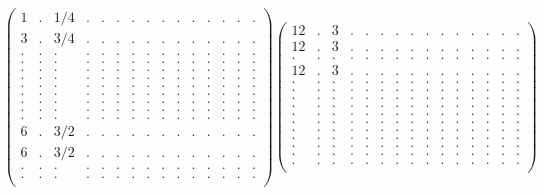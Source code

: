 \documentclass[12pt,a4paper]{amsart}
\begin{document}
\begin{align*}
\left(\begin{array}{rrrrrrrrrrrrrrr}%
1&.&1/4&.&.&.&.&.&.&.&.&.&.&.&.\\%
3&.&3/4&.&.&.&.&.&.&.&.&.&.&.&.\\%
.&.&.&.&.&.&.&.&.&.&.&.&.&.&.\\%
.&.&.&.&.&.&.&.&.&.&.&.&.&.&.\\%
.&.&.&.&.&.&.&.&.&.&.&.&.&.&.\\%
.&.&.&.&.&.&.&.&.&.&.&.&.&.&.\\%
.&.&.&.&.&.&.&.&.&.&.&.&.&.&.\\%
.&.&.&.&.&.&.&.&.&.&.&.&.&.&.\\%
.&.&.&.&.&.&.&.&.&.&.&.&.&.&.\\%
.&.&.&.&.&.&.&.&.&.&.&.&.&.&.\\%
.&.&.&.&.&.&.&.&.&.&.&.&.&.&.\\%
6&.&3/2&.&.&.&.&.&.&.&.&.&.&.&.\\%
6&.&3/2&.&.&.&.&.&.&.&.&.&.&.&.\\%
.&.&.&.&.&.&.&.&.&.&.&.&.&.&.\\%
.&.&.&.&.&.&.&.&.&.&.&.&.&.&.\\%
\end{array}\right)%
\left(\begin{array}{rrrrrrrrrrrrrrr}%
12&.&3&.&.&.&.&.&.&.&.&.&.&.&.\\%
12&.&3&.&.&.&.&.&.&.&.&.&.&.&.\\%
.&.&.&.&.&.&.&.&.&.&.&.&.&.&.\\%
12&.&3&.&.&.&.&.&.&.&.&.&.&.&.\\%
.&.&.&.&.&.&.&.&.&.&.&.&.&.&.\\%
.&.&.&.&.&.&.&.&.&.&.&.&.&.&.\\%
.&.&.&.&.&.&.&.&.&.&.&.&.&.&.\\%
.&.&.&.&.&.&.&.&.&.&.&.&.&.&.\\%
.&.&.&.&.&.&.&.&.&.&.&.&.&.&.\\%
.&.&.&.&.&.&.&.&.&.&.&.&.&.&.\\%
.&.&.&.&.&.&.&.&.&.&.&.&.&.&.\\%
.&.&.&.&.&.&.&.&.&.&.&.&.&.&.\\%
.&.&.&.&.&.&.&.&.&.&.&.&.&.&.\\%
.&.&.&.&.&.&.&.&.&.&.&.&.&.&.\\%
.&.&.&.&.&.&.&.&.&.&.&.&.&.&.\\%
\end{array}\right)%
\end{align*}
\end{document}
